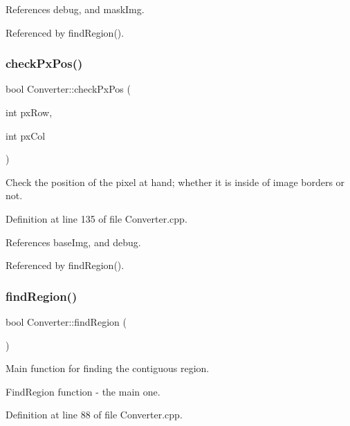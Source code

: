 References debug, and mask\+Img.



Referenced by find\+Region().

\mbox{\label{class_converter_a16df47c8a58a1c7b3818c9a2520e3a4b}} 
\subsubsection{\texorpdfstring{checkPxPos()}{checkPxPos()}}
{\footnotesize\ttfamily bool Converter\+::check\+Px\+Pos (\begin{DoxyParamCaption}\item[{int}]{px\+Row,  }\item[{int}]{px\+Col }\end{DoxyParamCaption})\hspace{0.3cm}{\ttfamily [private]}}



Check the position of the pixel at hand; whether it is inside of image borders or not. 



Definition at line 135 of file Converter.\+cpp.



References base\+Img, and debug.



Referenced by find\+Region().

\mbox{\label{class_converter_a4d50ec2ab4621cfc3b36f29f54e16a0b}} 
\subsubsection{\texorpdfstring{findRegion()}{findRegion()}}
{\footnotesize\ttfamily bool Converter\+::find\+Region (\begin{DoxyParamCaption}{ }\end{DoxyParamCaption})}



Main function for finding the contiguous region. 

Find\+Region function -\/ the main one. 

Definition at line 88 of file Converter.\+cpp.



